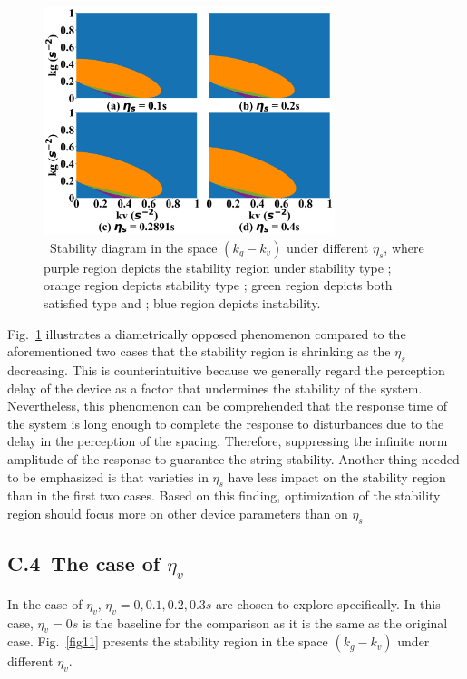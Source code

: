 \documentclass[journal]{IEEEtran}
\begin{document}
\begin{figure}
  \centering
  \includegraphics[width=8.5cm]{figs/fig10.png}
  \caption{~Stability diagram in the space $(k_g-k_v)$ under different $\eta_s$, where purple region depicts the stability region under stability type \uppercase\expandafter{}; orange region depicts stability type \uppercase\expandafter{}; green region depicts both satisfied type \uppercase\expandafter{} and \uppercase\expandafter{}; blue region depicts instability.}
  \label{fig10}
\end{figure}

Fig.~\ref{fig10} illustrates a diametrically opposed phenomenon compared to the aforementioned two cases that the stability region is shrinking as the $\eta_s$ decreasing. This is counterintuitive because we generally regard the perception delay of the device as a factor that undermines the stability of the system. Nevertheless, this phenomenon can be comprehended that the response time of the system is long enough to complete the response to disturbances due to the delay in the perception of the spacing. Therefore, suppressing the infinite norm amplitude of the response to guarantee the string stability. Another thing needed to be emphasized is that varieties in $\eta_s$ have less impact on the stability region than in the first two cases. Based on this finding, optimization of the stability region should focus more on other device parameters than on $\eta_s$


\subsection*{C.4~The case of $\eta_v$}

In the case of $\eta_v$, $\eta_v=0,0.1,0.2,0.3s$ are chosen to explore specifically. In this case, $\eta_v=0s$ is the baseline for the comparison as it is the same as the original case. Fig.~\ref{fig11} presents the stability region in the space $(k_g-k_v)$ under different $\eta_v$.
\end{document}
